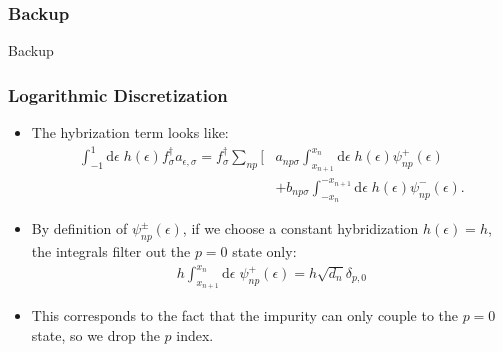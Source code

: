 \documentclass{beamer}
\newcommand{\dd}{\mathrm{d}}
\begin{document}
\begin{frame}
  \frametitle{Backup}

  \begin{center}
    {\Huge Backup }
  \end{center}
\end{frame}




\begin{frame}
  \frametitle{Logarithmic Discretization}

  \begin{itemize}
  \item The hybrization term looks like:
    \begin{align}
      \int_{-1}^1 \dd\epsilon \; h(\epsilon) f^\dagger_\sigma a_{\epsilon,\sigma} = f^\dagger_\sigma \sum_{np} \Big[ &a_{np\sigma} \int_{x_{n+1}}^{x_n} \dd\epsilon \; h(\epsilon) \psi^+_{np}(\epsilon) \\
                                                                                                                     &+ b_{np\sigma} \int_{-x_n}^{-x_{n+1}} \dd\epsilon \; h(\epsilon) \psi^-_{np}(\epsilon).
    \end{align}
  \item By definition of $\psi^\pm_{np}(\epsilon)$, if we choose a constant hybridization $h(\epsilon) = h$, the integrals filter out the $p=0$ state only:
    \begin{gather*}
      h\int_{x_{n+1}}^{x_n} \dd\epsilon \; \psi^+_{np}(\epsilon) = h\sqrt{d_n} \delta_{p,0}
    \end{gather*}
  \item This corresponds to the fact that the impurity can only couple to the $p=0$ state, so we drop the $p$ index.
  \end{itemize}
\end{frame}
\end{document}
